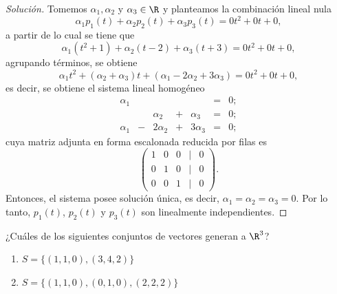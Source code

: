 \documentclass[a4,11pt]{aleph-notas}
\begin{document}
\begin{proof}[Solución]\hspace{0pt}
    Tomemos $\alpha_1, \alpha_2$ y $\alpha_3\in\R$ y planteamos la combinación lineal nula
    \[
        \alpha_1 p_1(t) + \alpha_2 p_2(t) + \alpha_3 p_3(t) = 0t^2 + 0t + 0,
    \]
    a partir de lo cual se tiene que
    \[
        \alpha_1(t^2 + 1) + \alpha_2(t - 2) + \alpha_3(t + 3) = 0t^2 + 0t + 0,
    \]
    agrupando términos, se obtiene
    \[
        \alpha_1t^2 + (\alpha_2 + \alpha_3)t + (\alpha_1 - 2\alpha_2 + 3\alpha_3) = 0t^2 + 0t + 0,
    \]
    es decir, se obtiene el sistema lineal homogéneo
    \[
        \begin{array}{ccccccc}
            \alpha_1 &  &  &  & & = & 0;\\
             &  & \alpha_2 & + & \alpha_3& = & 0;\\
            \alpha_1 & - & 2\alpha_2 & + & 3\alpha_3& = & 0;
        \end{array}
    \]
    cuya matriz adjunta en forma escalonada reducida por filas es
    \[
        \begin{pmatrix}
            1 & 0 & 0 & | & 0\\
            0 & 1 & 0 & | & 0\\
            0 & 0 & 1 & | & 0
        \end{pmatrix}.
    \]
    Entonces, el sistema posee solución única, es decir, $\alpha_1 = \alpha_2 = \alpha_3 = 0$. Por lo tanto, $p_1(t)$, $p_2(t)$ y $p_3(t)$ son linealmente independientes.
\end{proof}

\begin{ejer}
    ¿Cuáles de los siguientes conjuntos de vectores generan a $\R^3$?
\begin{enumerate}
        \item $S=\{(1, 1, 0), (3, 4, 2)\}$
        \item $S=\{(1, 1, 0), (0, 1, 0), (2, 2, 2)\}$
\end{enumerate}
\end{ejer}
\end{document}
